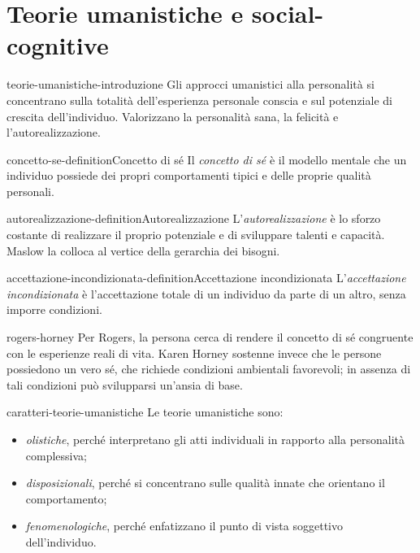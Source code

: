 \documentclass[preview]{standalone}
\begin{document}
\genpage

\section{Teorie umanistiche e social-cognitive}

\begin{snippet}{teorie-umanistiche-introduzione}
    Gli approcci umanistici alla personalità si concentrano sulla totalità
    dell'esperienza personale conscia e sul potenziale di crescita
    dell'individuo. Valorizzano la personalità sana, la felicità e
    l'autorealizzazione.
\end{snippet}

\begin{snippetdefinition}{concetto-se-definition}{Concetto di sé}
    Il \emph{concetto di sé} è il modello mentale che un individuo possiede dei
    propri comportamenti tipici e delle proprie qualità personali.
\end{snippetdefinition}

\begin{snippetdefinition}{autorealizzazione-definition}{Autorealizzazione}
    L'\emph{autorealizzazione} è lo sforzo costante di realizzare il proprio
    potenziale e di sviluppare talenti e capacità. Maslow la colloca al vertice
    della gerarchia dei bisogni.
\end{snippetdefinition}

\begin{snippetdefinition}{accettazione-incondizionata-definition}{Accettazione incondizionata}
    L'\emph{accettazione incondizionata} è l'accettazione totale di un individuo
    da parte di un altro, senza imporre condizioni.
\end{snippetdefinition}

\begin{snippet}{rogers-horney}
    Per Rogers, la persona cerca di rendere il concetto di sé congruente con le
    esperienze reali di vita. Karen Horney sostenne invece che le persone
    possiedono un vero sé, che richiede condizioni ambientali favorevoli; in
    assenza di tali condizioni può svilupparsi un'ansia di base.
\end{snippet}

\begin{snippet}{caratteri-teorie-umanistiche}
    Le teorie umanistiche sono:
    \begin{itemize}
        \item \emph{olistiche}, perché interpretano gli atti individuali in
        rapporto alla personalità complessiva;
        \item \emph{disposizionali}, perché si concentrano sulle qualità innate
        che orientano il comportamento;
        \item \emph{fenomenologiche}, perché enfatizzano il punto di vista
        soggettivo dell'individuo.
    \end{itemize}
\end{snippet}
\end{document}
